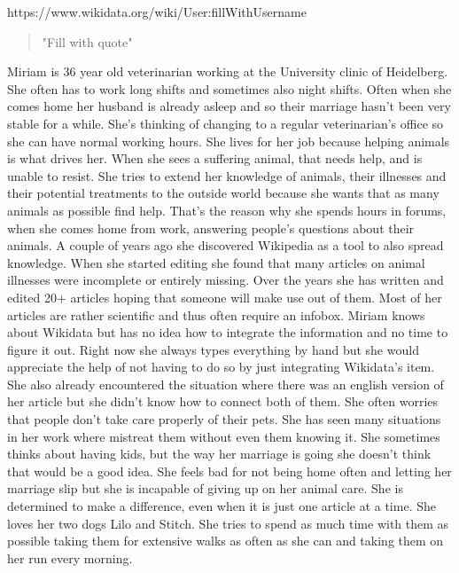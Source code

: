 \documentclass{article}
\begin{document}
\pagebreak

https://www.wikidata.org/wiki/User:fillWithUsername
\begin{quote}
"Fill with quote"
\end{quote}

Miriam is 36 year old veterinarian working at the University clinic of Heidelberg. She often has to work long shifts and sometimes also night shifts. Often when she comes home her husband is already asleep and so their marriage hasn't been very stable for a while. She's thinking of changing to a regular veterinarian's office so she can have normal working hours. She lives for her job because helping animals is what drives her. When she sees a suffering animal, that needs help, and is unable to resist. She tries to extend her knowledge of animals, their illnesses and their potential treatments to the outside world because she wants that as many animals as possible find help. That's the reason why she spends hours in forums, when she comes home from work, answering people's questions about their animals. A couple of years ago she discovered Wikipedia as a tool to also spread knowledge. When she started editing she found that many articles on animal illnesses were incomplete or entirely missing. Over the years she has written and edited 20+ articles hoping that someone will make use out of them. Most of her articles are rather scientific and thus often require an infobox. Miriam knows about Wikidata but has no idea how to integrate the information and no time to figure it out. Right now she always types everything by hand but she would appreciate the help of not having to do so by just integrating Wikidata's item. She also already encountered the situation where there was an english version of her article but she didn't know how to connect both of them. She often worries that people don't take care properly of their pets. She has seen many situations in her work where mistreat them without even them knowing it. 
She sometimes thinks about having kids, but the way her marriage is going she doesn't think that would be a good idea. She feels bad for not being home often and letting her marriage slip but she is incapable of giving up on her animal care. She is determined to make a difference, even when it is just one article at a time.
She loves her two dogs Lilo and Stitch. She tries to spend as much time with them as possible taking them for extensive walks as often as she can and taking them on her run every morning. 
\end{document}
